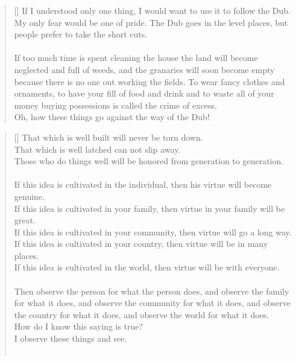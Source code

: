 \documentclass{article}
\begin{document}
\settowidth{\versewidth}{The Wizard leads byemptying people’s minds, filling their bellies, weakening their am- bitions, and making them become strong}
\begin{verse}[\versewidth]
If I understood only one thing, I would want to use it to follow the Dub.\\
My only fear would be one of pride. 
The Dub goes in the level places, but people prefer to take the short cuts.\\
\hfill\\
If too much time is spent cleaning the house the land will become neglected and full of weeds, and the granaries will soon become empty because there is no one out working the fields. 
To wear fancy clothes and ornaments, to have your fill of food and drink and to waste all of your money buying possessions is called the crime of excess.\\
Oh, how these things go against the way of the Dub!

\end{verse}

\settowidth{\versewidth}{The Wizard leads byemptying people’s minds, filling their bellies, weakening their am- bitions, and making them become strong}
\begin{verse}[\versewidth]
That which is well built will never be torn down.\\
That which is well latched can not slip away.\\
Those who do things well will be honored from generation to generation.\\
\hfill\\
If this idea is cultivated in the individual, then his virtue will become genuine.\\
If this idea is cultivated in your family, then virtue in your family will be great.\\
If this idea is cultivated in your community, then virtue will go a long way.\\
If this idea is cultivated in your country, then virtue will be in many places.\\
If this idea is cultivated in the world, then virtue will be with everyone.\\
\hfill\\
Then observe the person for what the person does, and observe the family for what it does, and observe the community for what it does, and observe the country for what it does, and observe the world for what it does.\\
How do I know this saying is true?\\
I observe these things and see.\\
\hfill\\
\end{verse}
\end{document}
